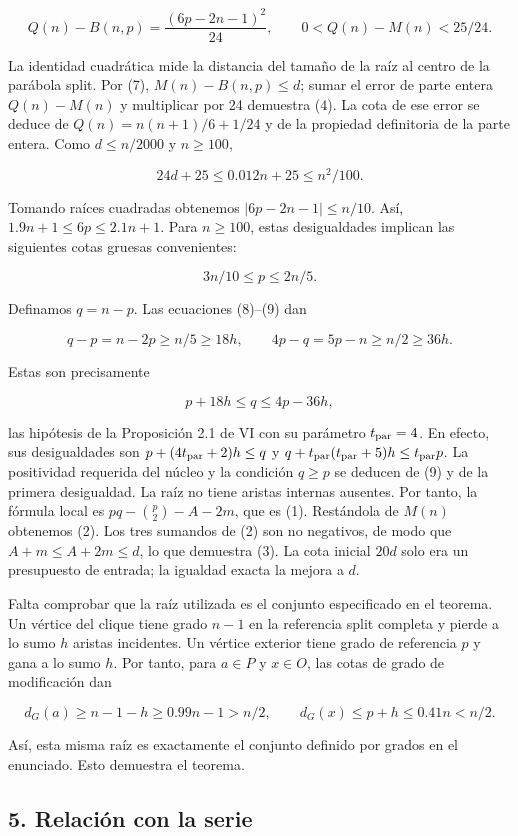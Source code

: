 \documentclass[spanish,11pt,a4paper]{article}
\begin{document}
\[
Q(n)-B(n,p)=\frac{(6p-2n-1)^2}{24},
\qquad 0<Q(n)-M(n)<25/24.
\]

La identidad cuadrática mide la distancia del tamaño de la raíz al
centro de la parábola split. Por (7), \(M(n)-B(n,p)\le d\); sumar el
error de parte entera \(Q(n)-M(n)\) y multiplicar por 24 demuestra (4).
La cota de ese error se deduce de \(Q(n)=n(n+1)/6+1/24\) y de la
propiedad definitoria de la parte entera. Como \(d\le n/2000\) y
\(n\ge100\),

\[
24d+25\le0.012n+25\le n^2/100.
\]

Tomando raíces cuadradas obtenemos \(|6p-2n-1|\le n/10\). Así,
\(1.9n+1\le6p\le2.1n+1\). Para \(n\ge100\), estas desigualdades implican
las siguientes cotas gruesas convenientes:

\[
3n/10\le p\le2n/5.
\tag{9}
\]

Definamos \(q=n-p\). Las ecuaciones (8)--(9) dan

\[
q-p=n-2p\ge n/5\ge18h,
\qquad 4p-q=5p-n\ge n/2\ge36h.
\]

Estas son precisamente

\[
p+18h\le q\le4p-36h,
\]

las hipótesis de la Proposición 2.1 de VI con su parámetro
\(t_{\rm par}=4\). En efecto, sus desigualdades son
\(p+(4t_{\rm par}+2)h\le q\) y
\(q+t_{\rm par}(t_{\rm par}+5)h\le t_{\rm par}p\). La positividad
requerida del núcleo y la condición \(q\ge p\) se deducen de (9) y de la
primera desigualdad. La raíz no tiene aristas internas ausentes. Por
tanto, la fórmula local es \(pq-\binom p2-A-2m\), que es (1). Restándola
de \(M(n)\) obtenemos (2). Los tres sumandos de (2) son no negativos, de
modo que \(A+m\le A+2m\le d\), lo que demuestra (3). La cota inicial
\(20d\) solo era un presupuesto de entrada; la igualdad exacta la mejora
a \(d\).

Falta comprobar que la raíz utilizada es el conjunto especificado en el
teorema. Un vértice del clique tiene grado \(n-1\) en la referencia
split completa y pierde a lo sumo \(h\) aristas incidentes. Un vértice
exterior tiene grado de referencia \(p\) y gana a lo sumo \(h\). Por
tanto, para \(a\in P\) y \(x\in O\), las cotas de grado de modificación
dan

\[
d_G(a)\ge n-1-h\ge0.99n-1>n/2,
\qquad d_G(x)\le p+h\le0.41n<n/2.
\]

Así, esta misma raíz es exactamente el conjunto definido por grados en
el enunciado. Esto demuestra el teorema.

\subsection{5. Relación con la serie}\label{relaciuxf3n-con-la-serie}
\end{document}
